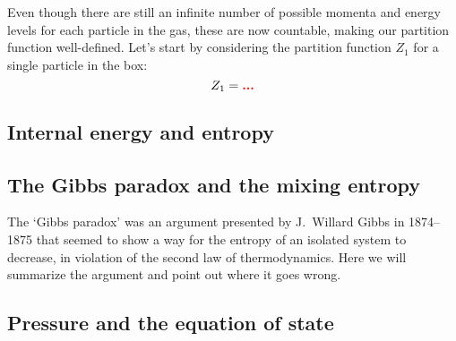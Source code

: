 Even though there are still an infinite number of possible momenta and energy levels for each particle in the gas, these are now countable, making our partition function well-defined.
Let's start by considering the partition function $Z_1$ for a single particle in the box:
\begin{equation*}
  Z_1 = \textcolor{red}{\textbf{...}}
\end{equation*}




\newpage %
\subsection{Internal energy and entropy}



\newpage %
\subsection{The Gibbs paradox and the mixing entropy}
The `Gibbs paradox' was an argument presented by J.\ Willard Gibbs in 1874--1875 that seemed to show a way for the entropy of an isolated system to decrease, in violation of the second law of thermodynamics.
Here we will summarize the argument and point out where it goes wrong.




\newpage %
\subsection{Pressure and the equation of state}
